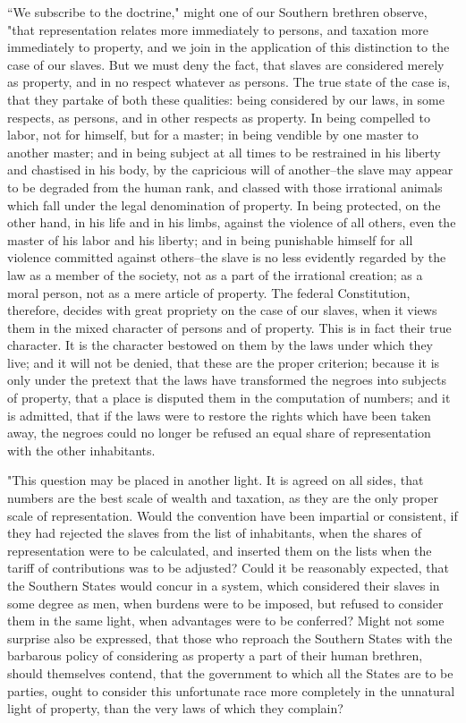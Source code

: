 ``We subscribe to the doctrine," might one of our Southern brethren observe, "that representation relates more immediately to persons, and taxation more immediately to property, and we join in the application of this distinction to the case of our slaves. But we must deny the fact, that slaves are considered merely as property, and in no respect whatever as persons. The true state of the case is, that they partake of both these qualities: being considered by our laws, in some respects, as persons, and in other respects as property. In being compelled to labor, not for himself, but for a master; in being vendible by one master to another master; and in being subject at all times to be restrained in his liberty and chastised in his body, by the capricious will of another--the slave may appear to be degraded from the human rank, and classed with those irrational animals which fall under the legal denomination of property. In being protected, on the other hand, in his life and in his limbs, against the violence of all others, even the master of his labor and his liberty; and in being punishable himself for all violence committed against others--the slave is no less evidently regarded by the law as a member of the society, not as a part of the irrational creation; as a moral person, not as a mere article of property. The federal Constitution, therefore, decides with great propriety on the case of our slaves, when it views them in the mixed character of persons and of property. This is in fact their true character. It is the character bestowed on them by the laws under which they live; and it will not be denied, that these are the proper criterion; because it is only under the pretext that the laws have transformed the negroes into subjects of property, that a place is disputed them in the computation of numbers; and it is admitted, that if the laws were to restore the rights which have been taken away, the negroes could no longer be refused an equal share of representation with the other inhabitants.

"This question may be placed in another light. It is agreed on all sides, that numbers are the best scale of wealth and taxation, as they are the only proper scale of representation. Would the convention have been impartial or consistent, if they had rejected the slaves from the list of inhabitants, when the shares of representation were to be calculated, and inserted them on the lists when the tariff of contributions was to be adjusted? Could it be reasonably expected, that the Southern States would concur in a system, which considered their slaves in some degree as men, when burdens were to be imposed, but refused to consider them in the same light, when advantages were to be conferred? Might not some surprise also be expressed, that those who reproach the Southern States with the barbarous policy of considering as property a part of their human brethren, should themselves contend, that the government to which all the States are to be parties, ought to consider this unfortunate race more completely in the unnatural light of property, than the very laws of which they complain?

